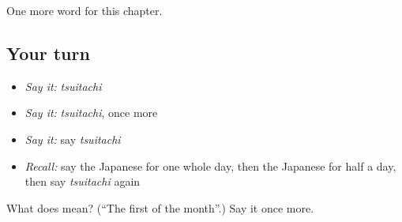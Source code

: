 \begin{grammarlens}[title={What you've built}]
One more word for this chapter.
\end{grammarlens}

\subsection*{Your turn}
\begin{itemize}
\raggedright
  \item \emph{Say it:} \emph{tsuitachi}
  \item \emph{Say it:} \emph{tsuitachi}, once more
  \item \emph{Say it:} say \emph{tsuitachi}
  \item \emph{Recall:} say the Japanese for one whole day, then the Japanese for half a day, then say \emph{tsuitachi} again
\end{itemize}

\begin{tcolorbox}[breakable,colback=teal!4,colframe=teal!35!black,title={Before you move on}]
What does  mean? (\textquotedblleft{}The first of the month\textquotedblright{}.) Say it once more.
\end{tcolorbox}

